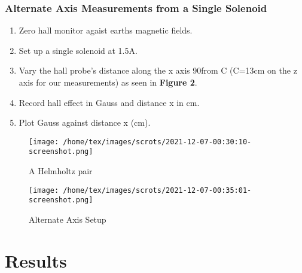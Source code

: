 \documentclass{article}
\begin{document}
   \subsubsection{Alternate Axis Measurements from a Single Solenoid}
   \begin{enumerate}
       \item Zero hall monitor agaist earths magnetic fields.
       \item Set up a single solenoid at 1.5A.
       \item Vary the hall probe's distance along the x axis 90\degree from C (C=13cm on the z axis for our measurements) as seen in \textbf{Figure 2}.
       \item Record hall effect in Gauss and distance x in cm.
       \item Plot Gauss against distance x (cm).
   \end{enumerate}
   \begin{figure}
       \centering
       \texttt{[image: /home/tex/images/scrots/2021-12-07-00:30:10-screenshot.png]}
       \caption{A Helmholtz pair}
   \end{figure}
   \begin{figure}
       \centering
       \texttt{[image: /home/tex/images/scrots/2021-12-07-00:35:01-screenshot.png]}
       \caption{Alternate Axis Setup}
   \end{figure}
   
   \section{Results}
\end{document}
